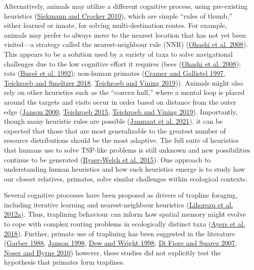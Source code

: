 \documentclass[twoside,12pt,final]{ucthesis-CA2012}
\begin{document}
\begin{ucmainmatter}
Alternatively, animals may utilize a different cognitive process, using pre-existing heuristics (\protect\hyperlink{ref-siekmann2010}{Siekmann and Crocker 2010}), which are simple ``rules of thumb,'' either learned or innate, for solving multi-destination routes. For example, animals may prefer to always move to the nearest location that has not yet been visited---a strategy called the nearest-neighbour rule (NNR) (\protect\hyperlink{ref-ohashi2008}{Ohashi et al. 2008}). This appears to be a solution used by a variety of taxa to solve navigational challenges due to the low cognitive effort it requires (bees (\protect\hyperlink{ref-ohashi2008}{Ohashi et al. 2008}); rats (\protect\hyperlink{ref-bures1992}{Bureš et al. 1992}); non-human primates (\protect\hyperlink{ref-cramer1997}{Cramer and Gallistel 1997}, \protect\hyperlink{ref-teichroeb2018}{Teichroeb and Smeltzer 2018}, \protect\hyperlink{ref-teichroeb2019a}{Teichroeb and Vining 2019})). Animals might also rely on other heuristics such as the ``convex hull,'' where a mental loop is placed around the targets and visits occur in order based on distance from the outer edge (\protect\hyperlink{ref-janson2000}{Janson 2000}, \protect\hyperlink{ref-teichroeb2015}{Teichroeb 2015}, \protect\hyperlink{ref-teichroeb2019a}{Teichroeb and Vining 2019}). Importantly, though many heuristic rules are possible (\protect\hyperlink{ref-janmaat2021}{Janmaat et al. 2021}), it can be expected that those that are most generalizable to the greatest number of resource distributions should be the most adaptive. The full suite of heuristics that humans use to solve TSP-like problems is still unknown and new possibilities continue to be generated (\protect\hyperlink{ref-ryser-welch2015a}{Ryser-Welch et al. 2015}). One approach to understanding human heuristics and how such heuristics emerge is to study how our closest relatives, primates, solve similar challenges within ecological contexts.

Several cognitive processes have been proposed as drivers of trapline foraging, including iterative learning and nearest-neighbour heuristics (\protect\hyperlink{ref-lihoreau2012b}{Lihoreau et al. 2012a}). Thus, traplining behaviour can inform how spatial memory might evolve to cope with complex routing problems in ecologically distinct taxa (\protect\hyperlink{ref-ayers2018}{Ayers et al. 2018}). Further, primate use of traplining has been suggested in the literature (\protect\hyperlink{ref-garber1988}{Garber 1988}, \protect\hyperlink{ref-janson1998}{Janson 1998}, \protect\hyperlink{ref-dew1998}{Dew and Wright 1998}, \protect\hyperlink{ref-difiore2007}{Di Fiore and Suarez 2007}, \protect\hyperlink{ref-noser2010}{Noser and Byrne 2010}) however, these studies did not explicitly test the hypothesis that primates form traplines.


\end{ucmainmatter}
\end{document}
